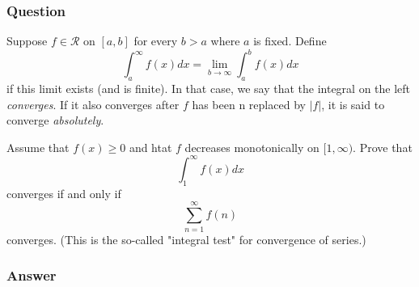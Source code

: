 \documentclass[12pt]{article}
\begin{document}
\subsubsection{Question}
Suppose $f \in \mathcal{R}$ on $[a,b]$ for every $b>a$ where $a$ is fixed. Define
\[\int_a^\infty f(x) dx = \lim_{b \to \infty}{\int_a^b f(x) dx}\]
if this limit exists (and is finite). In that case, we say that the integral on the left \emph{converges}. If it also converges after $f$ has been n replaced by $|f|$, it is said to converge \emph{absolutely}.

Assume that $f(x) \geq 0$ and htat $f$ decreases monotonically on $[1, \infty)$. Prove that
\[\int_1^\infty f(x) dx\]
converges if and only if 
\[\sum_{n=1}^\infty f(n)\]
converges. (This is the so-called "integral test" for convergence of series.)
\subsubsection{Answer}
\end{document}
